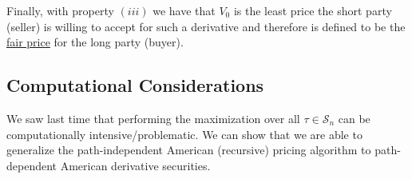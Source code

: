 \documentclass[12pt]{article}
\newlength\tindent
\renewcommand{\indent}{\hspace*{\tindent}}
\begin{document}
\indent Finally, with property $(iii)$ we have that $V_0$ is the least price the short party (seller) is willing to accept for such a derivative and therefore is defined to be the \underline{fair price} for the long party (buyer). \\

\subsection{Computational Considerations}

\indent We saw last time that performing the maximization over all $\tau \in \mathcal S_n$ can be computationally intensive/problematic. We can show that we are able to generalize the path-independent American (recursive) pricing algorithm to path-dependent American derivative securities. \\
\end{document}
